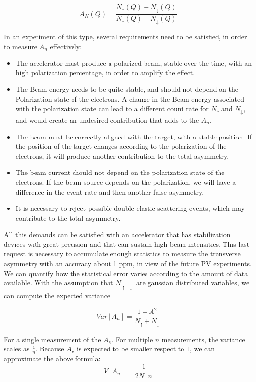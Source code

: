 \begin{equation}
A_{N} (Q) = \dfrac{N_{\uparrow}(Q) - N_{\downarrow}(Q)}{N_{\uparrow}(Q) + N_{\downarrow}(Q)}  
\end{equation} 

In an experiment of this type, several requirements need to be satisfied, in order to measure $A_{n}$ effectively:

\begin{itemize}
\item The accelerator must produce a polarized beam, stable over the time, with an high polarization percentage, in order to amplify the effect.
\item The Beam energy needs to be quite stable, and should not depend on the Polarization state of the electrons. A change in the Beam energy associated with the polarization state can lead to a different count rate for $N_{\uparrow}$ and $N_{\downarrow}$, and would create an undesired contribution that adds to the $A_{n}$.
\item The beam must be correctly aligned with the target, with a stable position. If the position of the target changes according to the polarization of the electrons, it will produce another contribution to the total asymmetry.
\item The beam current should not depend on the polarization state of the electrons. If the beam source depends on the polarization, we will have a difference in the event rate and then another false asymmetry.
\item It is necessary to reject possible double elastic scattering events, which may contribute to the total asymmetry. 
\end{itemize}

All this demands can be satisfied with an accelerator that has stabilization devices with great precision and that can sustain high beam intensities. This last request is necessary to accumulate enough statistics to measure the transverse asymmetry with an accuracy about 1 ppm, in view of the future PV experiments. We can quantify how the statistical error varies according to the amount of data available. With the assumption that $N_{\uparrow,\downarrow}$ are gaussian distributed variables, we can compute the expected variance

\begin{equation}
Var[A_{n}] = \dfrac{1 - A^{2}}{N_{\uparrow} + N_{\downarrow}} 
\end{equation}

For a single measurement of the $A_{n}$. For multiple $n$ measurements, the variance scales as $\frac{1}{n}$.
Because $A_{n}$ is expected to be smaller respect to 1, we can approximate the above formula:
\begin{equation} 
V[A_{n}] = \dfrac{1}{2N \cdot n}  \label{eq:Error}
\end{equation}

